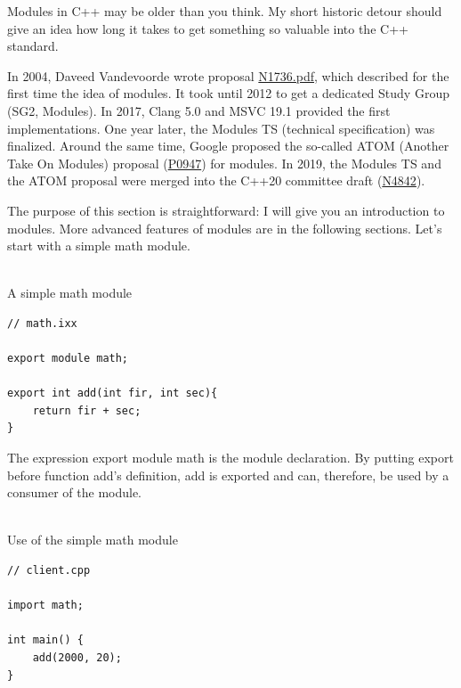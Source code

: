 \begin{tcolorbox}[colback=blue!5!white,colframe=blue!75!black,title=Regular Types]
Modules in C++ may be older than you think. My short historic detour should give an idea how long it takes to get something so valuable into the C++ standard.

In 2004, Daveed Vandevoorde wrote proposal \href{http://www.open-std.org/jtc1/sc22/wg21/docs/papers/2004/n1736.pdf}{N1736.pdf}, which described for the first time the idea of modules. It took until 2012 to get a dedicated Study Group (SG2, Modules). In 2017, Clang 5.0 and MSVC 19.1 provided the first implementations. One year later, the Modules TS (technical specification) was finalized. Around the same time, Google proposed the so-called ATOM (Another Take On Modules) proposal (\href{http://www.open-std.org/jtc1/sc22/wg21/docs/papers/2018/p0947r1.html}{P0947}) for modules. In 2019, the Modules TS and the ATOM proposal were merged into the C++20 committee draft (\href{https://github.com/cplusplus/draft/releases/tag/n4842}{N4842}).
\end{tcolorbox}


The purpose of this section is straightforward: I will give you an introduction to modules. More advanced features of modules are in the following sections. Let’s start with a simple math module.

\hspace*{\fill} \\ %
\noindent
A simple math module
\begin{lstlisting}[style=styleCXX]
// math.ixx

export module math;

export int add(int fir, int sec){
	return fir + sec;
}
\end{lstlisting}

The expression export module math is the module declaration. By putting export before function add’s definition, add is exported and can, therefore, be used by a consumer of the module.

\hspace*{\fill} \\ %
\noindent
Use of the simple math module
\begin{lstlisting}[style=styleCXX]
// client.cpp

import math;

int main() {
	add(2000, 20);
}
\end{lstlisting}

